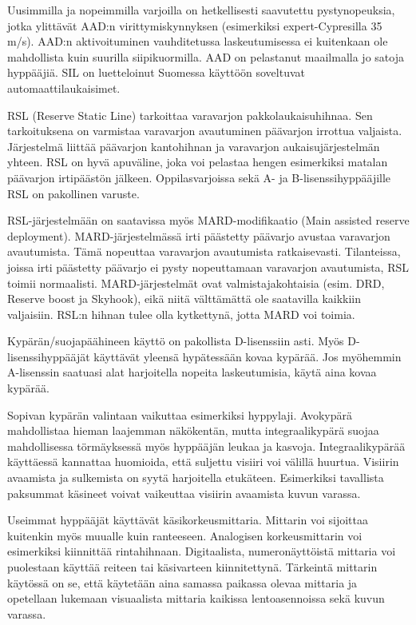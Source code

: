 Uusimmilla ja nopeimmilla varjoilla on hetkellisesti saavutettu pystynopeuksia, jotka ylittävät AAD:n virittymiskynnyksen (esimerkiksi expert-Cypresilla 35 m/s). AAD:n aktivoituminen vauhditetussa laskeutumisessa ei kuitenkaan ole mahdollista kuin suurilla siipikuormilla. AAD on pelastanut maailmalla jo satoja hyppääjiä. SIL on luetteloinut Suomessa käyttöön soveltuvat automaattilaukaisimet. 


RSL (Reserve Static Line) tarkoittaa varavarjon pakkolaukaisuhihnaa. Sen tarkoituksena on varmistaa varavarjon avautuminen päävarjon irrottua valjaista. Järjestelmä liittää päävarjon kantohihnan ja varavarjon aukaisujärjestelmän yhteen. RSL on hyvä apuväline, joka voi pelastaa hengen esimerkiksi matalan päävarjon irtipäästön jälkeen. Oppilasvarjoissa sekä A- ja B-lisenssihyppääjille RSL on pakollinen varuste. 


RSL-järjestelmään on saatavissa myös MARD-modifikaatio (Main assisted reserve deployment). MARD-järjestelmässä irti päästetty päävarjo avustaa varavarjon avautumista. Tämä nopeuttaa varavarjon avautumista ratkaisevasti. Tilanteissa, joissa irti päästetty päävarjo ei pysty nopeuttamaan varavarjon avautumista, RSL toimii normaalisti. MARD-järjestelmät ovat valmistajakohtaisia (esim. DRD, Reserve boost ja Skyhook), eikä niitä välttämättä ole saatavilla kaikkiin valjaisiin. RSL:n hihnan tulee olla kytkettynä, jotta MARD voi toimia. 


Kypärän/suojapäähineen käyttö on pakollista D-lisenssiin asti. Myös D-lisenssihyppääjät käyttävät yleensä hypätessään kovaa kypärää. Jos myöhemmin A-lisenssin saatuasi alat harjoitella nopeita laskeutumisia, käytä aina kovaa kypärää. 


Sopivan kypärän valintaan vaikuttaa esimerkiksi hyppylaji. Avokypärä mahdollistaa hieman laajemman näkökentän, mutta integraalikypärä suojaa mahdollisessa törmäyksessä myös hyppääjän leukaa ja kasvoja. Integraalikypärää käyttäessä kannattaa huomioida, että suljettu visiiri voi välillä huurtua. Visiirin avaamista ja sulkemista on syytä harjoitella etukäteen. Esimerkiksi tavallista paksummat käsineet voivat vaikeuttaa visiirin avaamista kuvun varassa.   


Useimmat hyppääjät käyttävät käsikorkeusmittaria. Mittarin voi sijoittaa kuitenkin myös muualle kuin ranteeseen. Analogisen korkeusmittarin voi esimerkiksi kiinnittää rintahihnaan. Digitaalista, numeronäyttöistä mittaria voi puolestaan käyttää reiteen tai käsivarteen kiinnitettynä. Tärkeintä mittarin käytössä on se, että käytetään aina samassa paikassa olevaa mittaria ja opetellaan lukemaan visuaalista mittaria kaikissa lentoasennoissa sekä kuvun varassa.  


